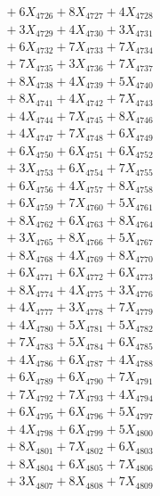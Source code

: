 \documentclass[a4paper,10pt]{article}
\begin{document}
{\begin{align}
&\;  + 6 X_{4726} + 8 X_{4727} + 4 X_{4728} \\[0.3ex]
&\;  + 3 X_{4729} + 4 X_{4730} + 3 X_{4731} \\[0.3ex]
&\;  + 6 X_{4732} + 7 X_{4733} + 7 X_{4734} \\[0.3ex]
&\;  + 7 X_{4735} + 3 X_{4736} + 7 X_{4737} \\[0.3ex]
&\;  + 8 X_{4738} + 4 X_{4739} + 5 X_{4740} \\[0.3ex]
&\;  + 8 X_{4741} + 4 X_{4742} + 7 X_{4743} \\[0.3ex]
&\;  + 4 X_{4744} + 7 X_{4745} + 8 X_{4746} \\[0.3ex]
&\;  + 4 X_{4747} + 7 X_{4748} + 6 X_{4749} \\[0.5ex]\allowbreak
&\;  + 6 X_{4750} + 6 X_{4751} + 6 X_{4752} \\[0.3ex]
&\;  + 3 X_{4753} + 6 X_{4754} + 7 X_{4755} \\[0.3ex]
&\;  + 6 X_{4756} + 4 X_{4757} + 8 X_{4758} \\[0.3ex]
&\;  + 6 X_{4759} + 7 X_{4760} + 5 X_{4761} \\[0.3ex]
&\;  + 8 X_{4762} + 6 X_{4763} + 8 X_{4764} \\[0.3ex]
&\;  + 3 X_{4765} + 8 X_{4766} + 5 X_{4767} \\[0.3ex]
&\;  + 8 X_{4768} + 4 X_{4769} + 8 X_{4770} \\[0.3ex]
&\;  + 6 X_{4771} + 6 X_{4772} + 6 X_{4773} \\[0.3ex]
&\;  + 8 X_{4774} + 4 X_{4775} + 3 X_{4776} \\[0.3ex]
&\;  + 4 X_{4777} + 3 X_{4778} + 7 X_{4779} \\[0.5ex]\allowbreak
&\;  + 4 X_{4780} + 5 X_{4781} + 5 X_{4782} \\[0.3ex]
&\;  + 7 X_{4783} + 5 X_{4784} + 6 X_{4785} \\[0.3ex]
&\;  + 4 X_{4786} + 6 X_{4787} + 4 X_{4788} \\[0.3ex]
&\;  + 6 X_{4789} + 6 X_{4790} + 7 X_{4791} \\[0.3ex]
&\;  + 7 X_{4792} + 7 X_{4793} + 4 X_{4794} \\[0.3ex]
&\;  + 6 X_{4795} + 6 X_{4796} + 5 X_{4797} \\[0.3ex]
&\;  + 4 X_{4798} + 6 X_{4799} + 5 X_{4800} \\[0.3ex]
&\;  + 8 X_{4801} + 7 X_{4802} + 6 X_{4803} \\[0.3ex]
&\;  + 8 X_{4804} + 6 X_{4805} + 7 X_{4806} \\[0.3ex]
&\;  + 3 X_{4807} + 8 X_{4808} + 7 X_{4809} \\[0.5ex]\allowbreak

\end{align}}
\end{document}
